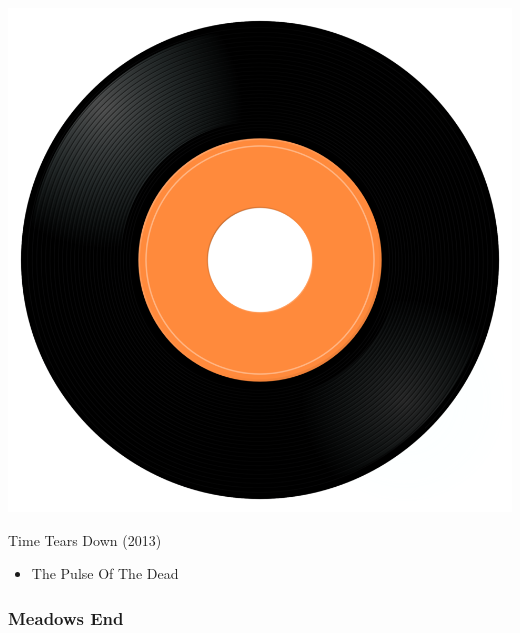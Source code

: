 \begin{minipage}[t]{0.25\textwidth}\vspace{0pt}
\captionsetup{type=figure}
\includegraphics[width=\textwidth]{Images/cover.png}
\caption*{Time Tears Down (2013)}
\end{minipage}
\begin{minipage}[t]{0.25\textwidth}\vspace{0pt}
\begin{itemize}[nosep,leftmargin=1em,labelwidth=*,align=left]
	\setlength{\itemsep}{0pt}
	\item The Pulse Of The Dead
\end{itemize}
\end{minipage}

\subsubsection{Meadows End}

